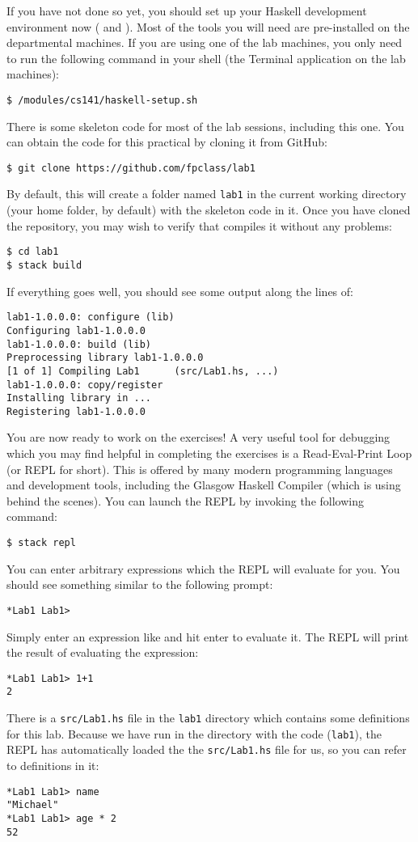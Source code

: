 If you have not done so yet, you should set up your Haskell development environment now ( and ). Most of the tools you will need are pre-installed on the departmental machines. If you are using one of the lab machines, you only need to run the following command in your shell (the Terminal application on the lab machines):
\begin{verbatim}
$ /modules/cs141/haskell-setup.sh
\end{verbatim}
There is some skeleton code for most of the lab sessions, including this one. You can obtain the code for this practical by cloning it from GitHub:
\begin{verbatim}
$ git clone https://github.com/fpclass/lab1
\end{verbatim}
By default, this will create a folder named \texttt{\small lab1} in the current working directory (your home folder, by default) with the skeleton code in it. Once you have cloned the repository, you may wish to verify that  compiles it without any problems:
\begin{verbatim}
$ cd lab1
$ stack build
\end{verbatim}
If everything goes well, you should see some output along the lines of:
\begin{verbatim}
lab1-1.0.0.0: configure (lib)
Configuring lab1-1.0.0.0
lab1-1.0.0.0: build (lib)
Preprocessing library lab1-1.0.0.0
[1 of 1] Compiling Lab1      (src/Lab1.hs, ...)
lab1-1.0.0.0: copy/register
Installing library in ...
Registering lab1-1.0.0.0
\end{verbatim}
You are now ready to work on the exercises! A very useful tool for debugging which you may find helpful in completing the exercises is a Read-Eval-Print Loop (or REPL for short). This is offered by many modern programming languages and development tools, including the Glasgow Haskell Compiler (which  is using behind the scenes). You can launch the REPL by invoking the following command:
\begin{verbatim}
$ stack repl
\end{verbatim}
You can enter arbitrary expressions which the REPL will evaluate for you. You should see something similar to the following prompt:
\begin{verbatim}
*Lab1 Lab1>
\end{verbatim}
Simply enter an expression like  and hit enter to evaluate it. The REPL will print the result of evaluating the expression:
\begin{verbatim}
*Lab1 Lab1> 1+1
2
\end{verbatim}
There is a \texttt{\small src/Lab1.hs} file in the \texttt{\small lab1} directory which contains some definitions for this lab. Because we have run  in the directory with the code (\texttt{\small lab1}), the REPL has automatically loaded the the \texttt{\small src/Lab1.hs} file for us, so you can refer to definitions in it:
\begin{verbatim}
*Lab1 Lab1> name
"Michael"
*Lab1 Lab1> age * 2
52
\end{verbatim}

